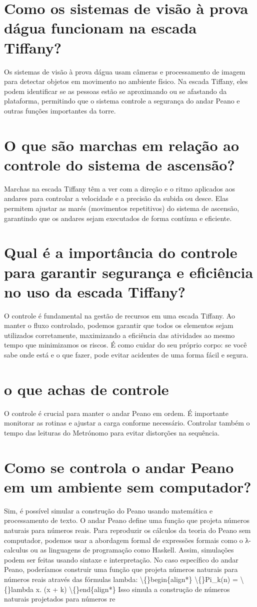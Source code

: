 \documentclass[11pt,a4paper]{article}
\begin{document}
\section{Como os sistemas de visão à prova dágua funcionam na escada Tiffany?}
Os sistemas de visão à prova dágua usam câmeras e processamento de imagem para detectar objetos em movimento no ambiente físico. Na escada Tiffany, eles podem identificar se as pessoas estão se aproximando ou se afastando da plataforma, permitindo que o sistema controle a segurança do andar Peano e outras funções importantes da torre.

\section{O que são marchas em relação ao controle do sistema de ascensão?}
Marchas na escada Tiffany têm a ver com a direção e o ritmo aplicados aos andares para controlar a velocidade e a precisão da subida ou desce. Elas permitem ajustar as marés (movimentos repetitivos) do sistema de ascensão, garantindo que os andares sejam executados de forma contínua e eficiente.

\section{Qual é a importância do controle para garantir segurança e eficiência no uso da escada Tiffany?}
O controle é fundamental na gestão de recursos em uma escada Tiffany. Ao manter o fluxo controlado, podemos garantir que todos os elementos sejam utilizados corretamente, maximizando a eficiência das atividades ao mesmo tempo que minimizamos os riscos. É como cuidar do seu próprio corpo: se você sabe onde está e o que fazer, pode evitar acidentes de uma forma fácil e segura.

\section{o que achas de controle}
O controle é crucial para manter o andar Peano em ordem. É importante monitorar as rotinas e ajustar a carga conforme necessário. Controlar também o tempo das leituras do Metrónomo para evitar distorções na sequência.

\section{Como se controla o andar Peano em um ambiente sem computador?}
Sim, é possível simular a construção do Peano usando matemática e processamento de texto. O andar Peano define uma função que projeta números naturais para números reais. Para reproduzir os cálculos da teoria do Peano sem computador, podemos usar a abordagem formal de expressões formais como o λ-calculus ou as linguagens de programação como Haskell. Assim, simulações podem ser feitas usando sintaxe e interpretação. No caso específico do andar Peano, poderíamos construir uma função que projeta números naturais para números reais através das fórmulas lambda: \textbackslash\{\}begin\{align*\} \textbackslash\{\}Pi\_k(n) = \textbackslash\{\}lambda x. (x + k) \textbackslash\{\}end\{align*\} Isso simula a construção de números naturais projetados para números re
\end{document}
